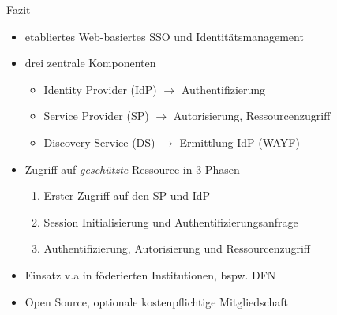
\begin{frame}{Fazit}
    \begin{itemize}
        \item etabliertes Web-basiertes SSO und Identitätsmanagement
        
        \item drei zentrale Komponenten
        \begin{itemize}
            \item Identity Provider (IdP) $\to$ Authentifizierung
            \item Service Provider (SP) $\to$ Autorisierung, Ressourcenzugriff
            \item Discovery Service (DS) $\to$ Ermittlung IdP {\footnotesize (WAYF)}
        \end{itemize}

        \item Zugriff auf \emph{geschützte} Ressource in 3 Phasen
        \begin{enumerate}
            \item Erster Zugriff auf den SP und IdP
            \item Session Initialisierung und Authentifizierungsanfrage
            \item Authentifizierung, Autorisierung und Ressourcenzugriff
        \end{enumerate}

        \item Einsatz v.a in föderierten Institutionen, bspw. DFN
        \item Open Source, optionale kostenpflichtige Mitgliedschaft
    \end{itemize}
\end{frame}

